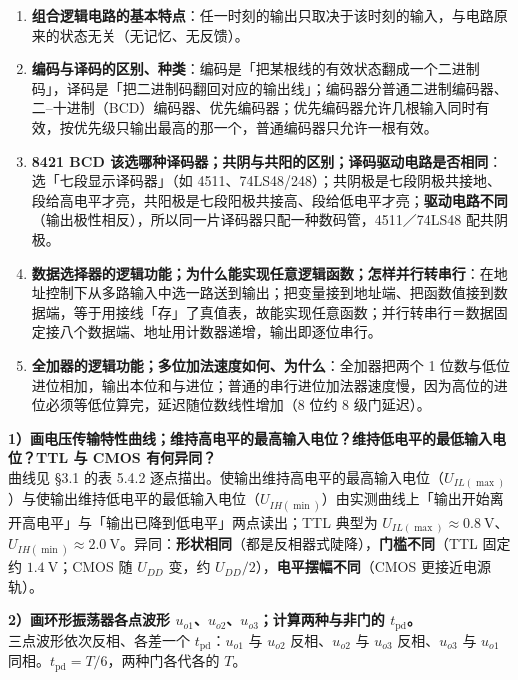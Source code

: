 \documentclass[11pt]{ctexart}
\let\orighdr\hdr
\renewcommand{\hdr}[2]{\needspace{10\baselineskip}\orighdr{#1}{#2}}
\let\origsubhdr\subhdr
\renewcommand{\subhdr}[1]{\needspace{3\baselineskip}\origsubhdr{#1}}
\begin{document}
\begin{enumerate}
  \item \textbf{组合逻辑电路的基本特点}：任一时刻的输出只取决于该时刻的输入，与电路原来的状态无关（无记忆、无反馈）。
  \item \textbf{编码与译码的区别、种类}：编码是「把某根线的有效状态翻成一个二进制码」，译码是「把二进制码翻回对应的输出线」；编码器分普通二进制编码器、二--十进制（BCD）编码器、优先编码器；优先编码器允许几根输入同时有效，按优先级只输出最高的那一个，普通编码器只允许一根有效。
  \item \textbf{8421 BCD 该选哪种译码器；共阴与共阳的区别；译码驱动电路是否相同}：选「七段显示译码器」（如 4511、74LS48/248）；共阴极是七段阴极共接地、段给高电平才亮，共阳极是七段阳极共接高、段给低电平才亮；\textbf{驱动电路不同}（输出极性相反），所以同一片译码器只配一种数码管，4511／74LS48 配共阴极。
  \item \textbf{数据选择器的逻辑功能；为什么能实现任意逻辑函数；怎样并行转串行}：在地址控制下从多路输入中选一路送到输出；把变量接到地址端、把函数值接到数据端，等于用接线「存」了真值表，故能实现任意函数；并行转串行＝数据固定接八个数据端、地址用计数器递增，输出即逐位串行。
  \item \textbf{全加器的逻辑功能；多位加法速度如何、为什么}：全加器把两个 1 位数与低位进位相加，输出本位和与进位；普通的串行进位加法器速度慢，因为高位的进位必须等低位算完，延迟随位数线性增加（8 位约 8 级门延迟）。
\end{enumerate}



\textbf{1）画电压传输特性曲线；维持高电平的最高输入电位？维持低电平的最低输入电位？TTL 与 CMOS 有何异同？}\\
曲线见 §3.1 的表 5.4.2 逐点描出。使输出维持高电平的最高输入电位（$U_{IL(\max)}$）与使输出维持低电平的最低输入电位（$U_{IH(\min)}$）由实测曲线上「输出开始离开高电平」与「输出已降到低电平」两点读出；TTL 典型为 $U_{IL(\max)}\approx0.8\ \mathrm{V}$、$U_{IH(\min)}\approx2.0\ \mathrm{V}$。异同：\textbf{形状相同}（都是反相器式陡降），\textbf{门槛不同}（TTL 固定约 $1.4\ \mathrm{V}$；CMOS 随 $U_{DD}$ 变，约 $U_{DD}/2$），\textbf{电平摆幅不同}（CMOS 更接近电源轨）。

\textbf{2）画环形振荡器各点波形 $u_{o1}$、$u_{o2}$、$u_{o3}$；计算两种与非门的 $t_{\mathrm{pd}}$。}\\
三点波形依次反相、各差一个 $t_{\mathrm{pd}}$：$u_{o1}$ 与 $u_{o2}$ 反相、$u_{o2}$ 与 $u_{o3}$ 反相、$u_{o3}$ 与 $u_{o1}$ 同相。$t_{\mathrm{pd}}=T/6$，两种门各代各的 $T$。
\end{document}
